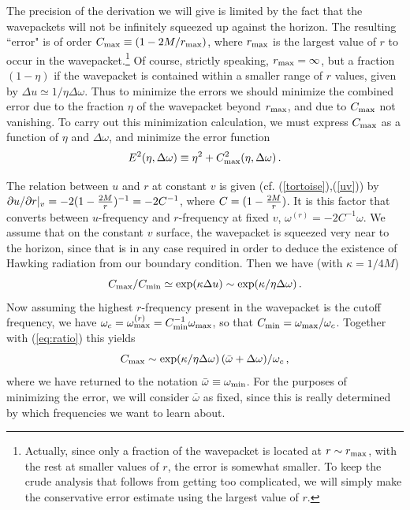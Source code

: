 \documentclass[12pt]{article}
\def\o{\omega}
\def\obar{\bar{\omega}}
\def\cmax{C_{\rm max}}
\def\cmin{C_{\rm min}}
\begin{document}
The precision of the derivation we will give is limited by the
fact that the wavepackets will not be infinitely squeezed up against
the horizon. The resulting ``error" is of order
$C_{\rm max}\equiv (1-2M/r_{\rm max})$, where $r_{\rm max}$ is the
largest value of $r$ to occur in the wavepacket.\footnote{Actually, since
only a fraction of the wavepacket is located at
$r\sim r_{\rm max}$, with
the rest at smaller values of $r$, the error is somewhat smaller.
To keep the crude analysis that follows from getting too complicated,
we will simply make the conservative error estimate using the largest
value of $r$.}
Of course, strictly speaking, $r_{\rm max}=\infty$, but a fraction
$(1-\eta)$ if the wavepacket is contained within a smaller range
of $r$ values, given by $\Delta u\simeq 1/\eta\Delta\omega$.
Thus to minimize the errors we should minimize the combined error due to
the fraction $\eta$ of the wavepacket beyond $r_{\rm max}$, and
due to $C_{\rm max}$ not vanishing.
To carry out this minimization calculation, we must express
$\cmax$ as a function of $\eta$ and $\Delta\o$,
and minimize the error function
\begin{equation}
E^2(\eta,\Delta\o)\equiv\eta^2+\cmax^2(\eta,\Delta\o)\, .
\label{eq:E}
\end{equation}

The relation between $u$ and $r$ at constant $v$ is given
(cf. (\ref{tortoise}),(\ref{uv})) by
$\partial u/\partial r|_v=-2(1-{2M\over r})^{-1}= -2C^{-1}$,
where $C=(1-{2M\over r})$. It is this factor
that converts between $u$-frequency and $r$-frequency
at fixed $v$, $\o^{(r)}=-2C^{-1}\o$.
We assume that on the constant $v$ surface, the wavepacket is squeezed
very near to the horizon, since that is in any case required in order
to deduce the existence of Hawking radiation from our boundary condition.
Then we have (with $\kappa=1/4M$)
\begin{equation}\cmax/\cmin\simeq
\exp(\kappa\Delta u)
\sim \exp(\kappa/\eta\Delta\o)\, .
\label{eq:ratio}
\end{equation}
Now assuming the highest $r$-frequency present in the wavepacket is
the cutoff frequency, we have
$\o_c=\o^{(r)}_{\rm max}=\cmin^{-1}\o_{\rm max}$,
so that $\cmin=\o_{\rm max}/\o_c$.
Together with (\ref{eq:ratio}) this yields
\begin{equation}
\cmax\sim \exp(\kappa/\eta\Delta\o)\,
(\obar+\Delta\o)/\o_c\, ,
\label{eq:cmax}
\end{equation}
where we have returned to the notation
$\obar\equiv\o_{\rm min}$.
For the purposes of minimizing the error, we will consider
$\obar$ as fixed, since this is really determined by which
frequencies we want to learn about.
\end{document}
